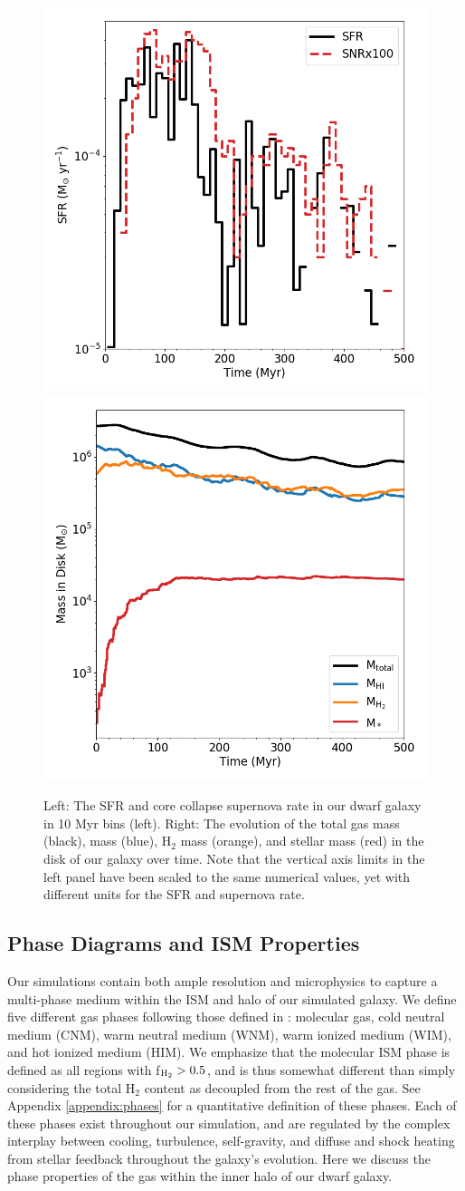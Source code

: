 \documentclass[twocolumn]{aastex61}
\begin{document}
\begin{figure}
\centering
\includegraphics[width=0.475\linewidth]{sfr_snrx100}
\includegraphics[width=0.475\linewidth]{mass_evolution}
\caption{Left: The SFR and core collapse supernova rate in our dwarf galaxy in 10 Myr bins (left). Right: The evolution of the total gas mass (black),  mass (blue), H$_2$ mass (orange), and stellar mass (red) in the disk of our galaxy over time. Note that the vertical axis limits in the left panel have been scaled to the same numerical values, yet with different units for the SFR and supernova rate.}
\label{fig:sfr_mass_evolution}
\end{figure}

\subsection{Phase Diagrams and ISM Properties}
\label{sec:phase}

Our simulations contain both ample resolution and microphysics to capture a multi-phase medium within the ISM and halo of our simulated galaxy. We define five different gas phases following those defined in \citep{Draine2011}: molecular gas, cold neutral medium (CNM), warm neutral medium (WNM), warm ionized medium (WIM), and hot ionized medium (HIM). We emphasize that the molecular ISM phase is defined as all regions with f$_{\rm H_2} > 0.5$, and is thus somewhat different than simply considering the total H$_2$ content as decoupled from the rest of the gas. See Appendix \ref{appendix:phases} for a quantitative definition of these phases. Each of these phases exist throughout our simulation, and are regulated by the complex interplay between cooling, turbulence, self-gravity, and diffuse and shock heating from stellar feedback throughout the galaxy's evolution. Here we discuss the phase properties of the gas within the inner halo of our dwarf galaxy.
\end{document}
